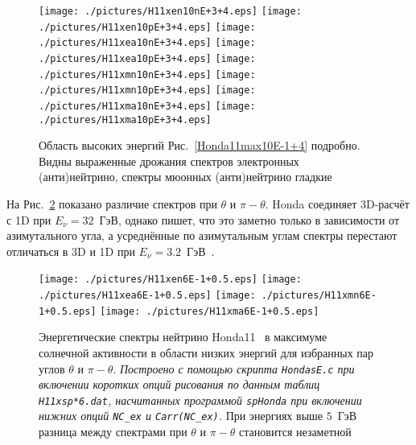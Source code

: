 \clearpage
\begin{figure}[!ht]
\texttt{[image: ./pictures/H11xen10nE+3+4.eps]}
\texttt{[image: ./pictures/H11xen10pE+3+4.eps]}
\texttt{[image: ./pictures/H11xea10nE+3+4.eps]}
\texttt{[image: ./pictures/H11xea10pE+3+4.eps]}
\texttt{[image: ./pictures/H11xmn10nE+3+4.eps]}
\texttt{[image: ./pictures/H11xmn10pE+3+4.eps]}
\texttt{[image: ./pictures/H11xma10nE+3+4.eps]}
\texttt{[image: ./pictures/H11xma10pE+3+4.eps]}
\caption{Область высоких энергий Рис.~\ref{Honda11max10E-1+4} подробно. Видны выраженные дрожания спектров электронных (анти)нейтрино, спектры мюонных (анти)нейтрино гладкие}
\label{Honda11max10E+3+4}
\end{figure}

На Рис.~\ref{Honda11max6E-1+0.5} показано различие спектров при $\theta$ и $\pi-\theta$. Honda соединяет 3D-расчёт с 1D при $E_{\nu}=32$~ГэВ, однако пишет, что это заметно только в зависимости от азимутального угла, а усреднённые по азимутальным углам спектры перестают отличаться в 3D и 1D при $E_{\nu}=3.2$~ГэВ~\cite{Honda:2011nf}.
\begin{figure}[!ht]
\texttt{[image: ./pictures/H11xen6E-1+0.5.eps]}
\texttt{[image: ./pictures/H11xea6E-1+0.5.eps]}
\texttt{[image: ./pictures/H11xmn6E-1+0.5.eps]}
\texttt{[image: ./pictures/H11xma6E-1+0.5.eps]}
\caption{Энергетические спектры нейтрино Honda11~\cite{Honda:2011nf} в максимуме солнечной активности в области низких энергий для избранных пар углов $\theta$ и $\pi-\theta$. \textit{Построено с помощью скрипта \texttt{HondasE.c} при включении коротких опций рисования по данным таблиц \texttt{H11xsp*6.dat}, насчитанных программой \texttt{spHonda} при включении нижних опций \texttt{NC\_ex} и \texttt{Carr(NC\_ex)}.} При энергиях выше $5$~ГэВ разница между спектрами при $\theta$ и $\pi-\theta$ становится незаметной}
\label{Honda11max6E-1+0.5}
\end{figure}

